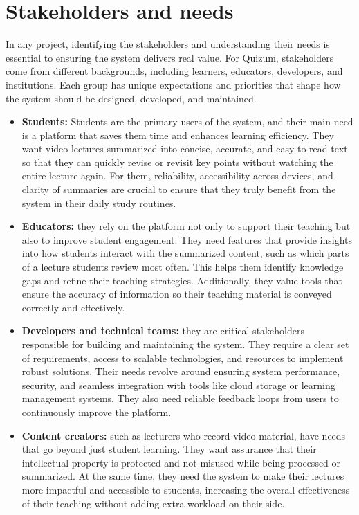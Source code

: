 \section{Stakeholders and needs}
In any project, identifying the stakeholders and understanding their needs is essential to ensuring the system delivers real value. For Quizum, stakeholders come from different backgrounds, including learners, educators, developers, and institutions. Each group has unique expectations and priorities that shape how the system should be designed, developed, and maintained.
\begin{itemize}
    \item \textbf{Students:} Students are the primary users of the system, and their main need is a platform that saves them time and enhances learning efficiency. They want video lectures summarized into concise, accurate, and easy-to-read text so that they can quickly revise or revisit key points without watching the entire lecture again. For them, reliability, accessibility across devices, and clarity of summaries are crucial to ensure that they truly benefit from the system in their daily study routines.
    \item \textbf{Educators:} they rely on the platform not only to support their teaching but also to improve student engagement. They need features that provide insights into how students interact with the summarized content, such as which parts of a lecture students review most often. This helps them identify knowledge gaps and refine their teaching strategies. Additionally, they value tools that ensure the accuracy of information so their teaching material is conveyed correctly and effectively.
    \item \textbf{Developers and technical teams:} they are critical stakeholders responsible for building and maintaining the system. They require a clear set of requirements, access to scalable technologies, and resources to implement robust solutions. Their needs revolve around ensuring system performance, security, and seamless integration with tools like cloud storage or learning management systems. They also need reliable feedback loops from users to continuously improve the platform.
    \item \textbf{Content creators:} such as lecturers who record video material, have needs that go beyond just student learning. They want assurance that their intellectual property is protected and not misused while being processed or summarized. At the same time, they need the system to make their lectures more impactful and accessible to students, increasing the overall effectiveness of their teaching without adding extra workload on their side.
\end{itemize}